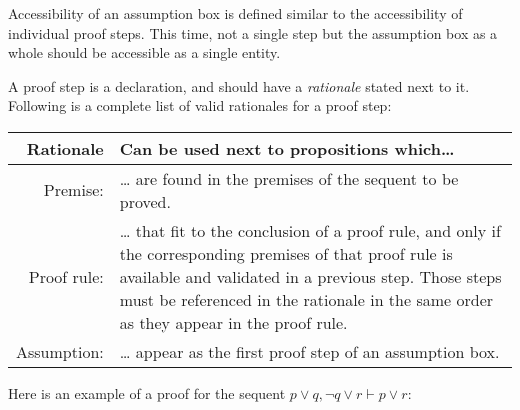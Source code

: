 \documentclass{article}
\newcommand{\seq}{\ensuremath{\vdash}}
\begin{document}
Accessibility of an assumption box is defined similar to the
accessibility of individual proof steps. This time, not a single
step but the assumption box as a whole should be accessible as a
single entity.

A proof step is a declaration, and should have a \textit{rationale}
stated next to it. Following is a complete list of valid rationales
for a proof step:
\begin{center}
	\begin{tabular}{r | p{37em}}
		\textbf{Rationale} & \textbf{Can be used next to propositions which\ldots{}}\\\hline
		Premise: & \ldots{} are found in the premises of the sequent to be proved.\\
		Proof rule: & \ldots{} that fit to the conclusion of a proof rule, and only if the
			corresponding premises of that proof rule is available and validated in a
			previous step. Those steps must be referenced in the rationale in the
			same order as they appear in the proof rule.\\
		Assumption: & \ldots{} appear as the first proof step of an assumption box.
	\end{tabular}
\end{center}

Here is an example of a proof for the sequent
$p \lor q, \neg q \lor r \seq p \lor r$:
\end{document}
